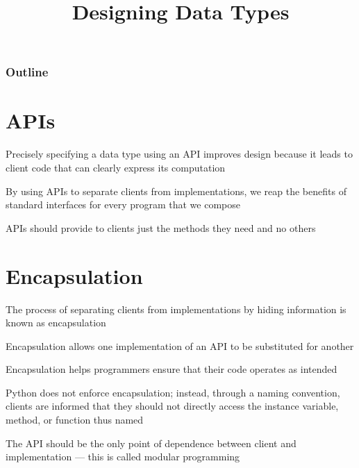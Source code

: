 \documentclass[8pt,a4paper,compress]{beamer}
\title{Designing Data Types}
\date{}
\begin{document}
\begin{frame}
\vfill
\titlepage
\end{frame}

\begin{frame}
\frametitle{Outline}
\tableofcontents
\end{frame}

\section{APIs}
\begin{frame}[fragile]
\pause

Precisely specifying a data type using an API improves design because it leads to client code that can clearly express its computation 

\pause
\bigskip

By using APIs to separate clients from implementations, we reap the benefits of standard interfaces for every program that we compose

\pause
\bigskip

APIs should provide to clients just the methods they need and no others
\end{frame}

\section{Encapsulation}
\begin{frame}[fragile]
\pause

The process of separating clients from implementations by hiding information is known as encapsulation

\pause
\bigskip

Encapsulation allows one implementation of an API to be substituted for another

\pause
\bigskip

Encapsulation helps programmers ensure that their code operates as intended

\pause
\bigskip

Python does not enforce encapsulation; instead, through a naming convention, clients are informed that they should not directly access the instance variable, method, or function thus named

\pause
\bigskip

The API should be the only point of dependence between client and implementation --- this is called modular programming
\end{frame}
\end{document}
